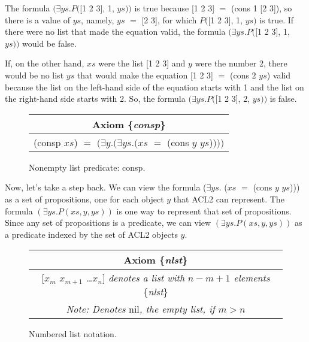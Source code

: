 The formula
$(\exists ys.P($\textsf{[1 2 3]}, \textsf{1}, $ys))$ is true
because \textsf{[1 2 3]} $=$ \textsf{(cons 1 [2 3])},
so there is a value of $ys$, namely, $ys$ $=$ \textsf{[2 3]},
for which $P($\textsf{[1 2 3]}, \textsf{1}, $ys)$ is true.
If there were no list that made the equation valid,
the formula $(\exists ys.P($[1 2 3], \textsf{1}, $ys))$
would be false.

If, on the other hand, $xs$ were the list \textsf{[1 2 3]}
and $y$ were the number 2, there would be no list
$ys$ that would make the equation \textsf{[1 2 3]} $=$ \textsf{(cons $2$ $ys$)} valid
because the list on the left-hand side of the equation
starts with 1 and the list on the right-hand side starts with 2.
So, the formula $(\exists ys.P($\textsf{[1 2 3]}, \textsf{2}, $ys))$
is false.

\begin{figure}
\begin{tabular}{c}
Axiom \{\emph{consp}\} \\
\hline
\textsf{(consp $xs$)} $=$  $(\exists y.(\exists ys.(xs$ $=$ \textsf{(cons $y$ $ys$)}$)))$
\end{tabular}
\caption{Nonempty list predicate: \textsf{consp}.}
\label{consp-axiom}
\end{figure}

Now, let's take a step back.
We can view the formula
($\exists ys.$ ($xs$ $=$ \textsf{(cons $y$ $ys$)}))
as a set of propositions,
one for each object $y$ that ACL2 can represent.
The formula
$(\exists ys.P(xs, y, ys))$ is one way to represent that
set of propositions.
Since any set of propositions is a predicate,
we can view $(\exists ys.P(xs, y, ys))$ as a predicate indexed
by the set of ACL2 objects $y$.

\begin{figure}
\begin{tabular}{c}
Axiom \{\emph{nlst}\}\\
\hline
\textsf{[$x_{m}$  $x_{m+1}$ \dots $x_{n}$]}  \emph{denotes a list with $n - m + 1$ elements} \{\emph{nlst}\} \\
\emph{Note: Denotes} \textsf{nil}\emph{, the empty list, if $m > n$}\\
\end{tabular}
\caption{Numbered list notation.}
\label{numbered-list-interpretation}
\end{figure}

